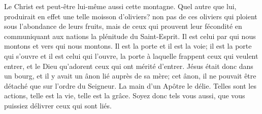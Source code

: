 Le Christ est peut-être lui-même aussi cette montagne.
Quel autre que lui, produirait en effet une telle moisson d’oliviers?
	non pas de ces oliviers qui ploient sous l’abondance de leurs fruits,
	mais de ceux qui prouvent leur fécondité
	en communiquant aux nations la plénitude du Saint-Esprit.
Il est celui par qui nous montons et vers qui nous montons.
Il est la porte et il est la voie;
	il est la porte qui s’ouvre et il est celui qui l’ouvre,
	la porte à laquelle frappent ceux qui veulent entrer,
	et le Dieu qu’adorent ceux qui ont mérité d’entrer.
Jésus était donc dans un bourg, et il y avait un ânon lié auprès de sa mère;
	cet ânon, il ne pouvait être détaché que sur l’ordre du Seigneur.
La main d’un Apôtre le délie.
	Telles sont les actions, telle est la vie, telle est la grâce.
	Soyez donc tels vous aussi, que vous puissiez délivrer ceux qui sont liés.
